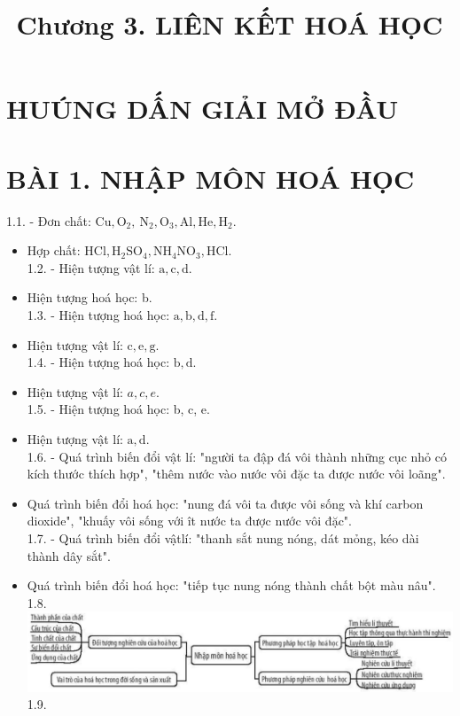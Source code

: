 \documentclass[10pt]{article}
\title{Chương 3. LIÊN KẾT HOÁ HỌC }
\author{}
\date{}
\begin{document}
\maketitle
\captionsetup{singlelinecheck=false}
\section*{HUÚNG DẤN GIẢI MỞ ĐẦU}
\section*{BÀI 1. NHẬP MÔN HOÁ HỌC}
1.1. - Đơn chất: $\mathrm{Cu}, \mathrm{O}_{2}, \mathrm{~N}_{2}, \mathrm{O}_{3}, \mathrm{Al}, \mathrm{He}, \mathrm{H}_{2}$.

\begin{itemize}
  \item Hợp chất: $\mathrm{HCl}, \mathrm{H}_{2} \mathrm{SO}_{4}, \mathrm{NH}_{4} \mathrm{NO}_{3}, \mathrm{HCl}$.\\
1.2. - Hiện tượng vật lí: $\mathrm{a}, \mathrm{c}, \mathrm{d}$.
  \item Hiện tượng hoá học: b.\\
1.3. - Hiện tượng hoá học: $\mathrm{a}, \mathrm{b}, \mathrm{d}, \mathrm{f}$.
  \item Hiện tượng vật lí: $\mathrm{c}, \mathrm{e}, \mathrm{g}$.\\
1.4. - Hiện tượng hoá học: $\mathrm{b}, \mathrm{d}$.
  \item Hiện tượng vật lí: $a, c, e$.\\
1.5. - Hiện tượng hoá học: b, c, e.
  \item Hiện tượng vật lí: $\mathrm{a}, \mathrm{d}$.\\
1.6. - Quá trình biến đổi vật lí: "người ta đập đá vôi thành những cục nhỏ có kích thước thích hợp", "thêm nước vào nước vôi đặc ta được nước vôi loãng".
  \item Quá trình biến đổi hoá học: "nung đá vôi ta được vôi sống và khí carbon dioxide", "khuấy vôi sống với ît nước ta được nước vôi đặc".\\
1.7. - Quá trình biến đổi vậtlí: "thanh sắt nung nóng, dát mỏng, kéo dài thành dây sắt".
  \item Quá trình biến đổi hoá học: "tiếp tục nung nóng thành chất bột màu nâu".\\
1.8.\\
\includegraphics[max width=\textwidth, center]{2025_10_23_57761e23b8c46a11c3efg-01}\\
1.9.
\end{itemize}
\end{document}
